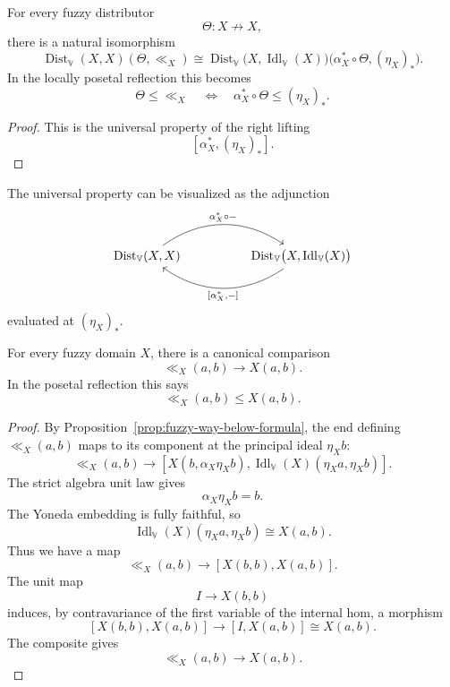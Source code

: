 \begin{proposition}
\label{prop:way-below-universal-property}
For every fuzzy distributor
\[
    \Theta:X\nrightarrow X,
\]
there is a natural isomorphism
\[
    \operatorname{Dist}_{\mathbb V}(X,X)(\Theta,\ll_X)
    \cong
    \operatorname{Dist}_{\mathbb V}
    \bigl(X,\operatorname{Idl}_{\mathbb V}(X)\bigr)
    \bigl(\alpha_X^\ast\circ\Theta,(\eta_X)_\ast\bigr).
\]
In the locally posetal reflection this becomes
\[
    \Theta\leq\ll_X
    \quad\Longleftrightarrow\quad
    \alpha_X^\ast\circ\Theta\leq(\eta_X)_\ast.
\]
\end{proposition}

\begin{proof}
This is the universal property of the right lifting
\[
    [\alpha_X^\ast,(\eta_X)_\ast].
\]
\end{proof}

The universal property can be visualized as the adjunction
\[
\begin{tikzcd}[column sep=huge,row sep=large]
\operatorname{Dist}_{\mathbb V}(X,X)
    \ar[r,bend left=35,"{\alpha_X^\ast\circ -}"]
&
\operatorname{Dist}_{\mathbb V}
    \bigl(X,\operatorname{Idl}_{\mathbb V}(X)\bigr)
    \ar[l,bend left=35,"{[\alpha_X^\ast,-]}"]
\end{tikzcd}
\]
evaluated at \((\eta_X)_\ast\).

\begin{proposition}
\label{prop:fuzzy-way-below-implies-below}
For every fuzzy domain \(X\), there is a canonical comparison
\[
    \ll_X(a,b)\to X(a,b).
\]
In the posetal reflection this says
\[
    \ll_X(a,b)\leq X(a,b).
\]
\end{proposition}

\begin{proof}
By Proposition~\ref{prop:fuzzy-way-below-formula}, the end defining
\(\ll_X(a,b)\) maps to its component at the principal ideal \(\eta_X b\):
\[
    \ll_X(a,b)
    \to
    \left[
        X(b,\alpha_X\eta_X b),
        \operatorname{Idl}_{\mathbb V}(X)(\eta_X a,\eta_X b)
    \right].
\]
The strict algebra unit law gives
\[
    \alpha_X\eta_X b=b.
\]
The Yoneda embedding is fully faithful, so
\[
    \operatorname{Idl}_{\mathbb V}(X)(\eta_X a,\eta_X b)
    \cong
    X(a,b).
\]
Thus we have a map
\[
    \ll_X(a,b)
    \to
    [X(b,b),X(a,b)].
\]
The unit map
\[
    I\to X(b,b)
\]
induces, by contravariance of the first variable of the internal hom, a morphism
\[
    [X(b,b),X(a,b)]
    \to
    [I,X(a,b)]
    \cong
    X(a,b).
\]
The composite gives
\[
    \ll_X(a,b)\to X(a,b).
\]
\end{proof}

